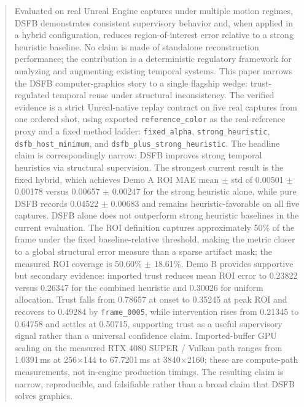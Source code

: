 \documentclass[11pt,letterpaper]{article}
\theoremstyle{gcresult}
\theoremstyle{definition}
\begin{document}
\begin{abstract}
Evaluated on real Unreal Engine captures under multiple motion regimes, DSFB demonstrates consistent supervisory behavior and, when applied in a hybrid configuration, reduces region-of-interest error relative to a strong heuristic baseline. No claim is made of standalone reconstruction performance; the contribution is a deterministic regulatory framework for analyzing and augmenting existing temporal systems.
This paper narrows the DSFB computer-graphics story to a single flagship wedge: trust-regulated temporal reuse under structural inconsistency. The verified evidence is a strict Unreal-native replay contract on five real captures from one ordered shot, using exported \texttt{reference\_color} as the real-reference proxy and a fixed method ladder: \texttt{fixed\_alpha}, \texttt{strong\_heuristic}, \texttt{dsfb\_host\_minimum}, and \texttt{dsfb\_plus\_strong\_heuristic}. The headline claim is correspondingly narrow: DSFB improves strong temporal heuristics via structural supervision. The strongest current result is the fixed hybrid, which achieves Demo A ROI MAE mean $\pm$ std of 0.00501 $\pm$ 0.00178 versus 0.00657 $\pm$ 0.00247 for the strong heuristic alone, while pure DSFB records 0.04522 $\pm$ 0.00683 and remains heuristic-favorable on all five captures. DSFB alone does not outperform strong heuristic baselines in the current evaluation. The ROI definition captures approximately 50\% of the frame under the fixed baseline-relative threshold, making the metric closer to a global structural error measure than a sparse artifact mask; the measured ROI coverage is 50.60\% $\pm$ 18.61\%. Demo B provides supportive but secondary evidence: imported trust reduces mean ROI error to 0.23822 versus 0.26347 for the combined heuristic and 0.30026 for uniform allocation. Trust falls from 0.78657 at onset to 0.35245 at peak ROI and recovers to 0.49284 by \texttt{frame\_0005}, while intervention rises from 0.21345 to 0.64758 and settles at 0.50715, supporting trust as a useful supervisory signal rather than a universal confidence claim. Imported-buffer GPU scaling on the measured RTX 4080 SUPER / Vulkan path ranges from 1.0391\,ms at 256$\times$144 to 67.7201\,ms at 3840$\times$2160; these are compute-path measurements, not in-engine production timings. The resulting claim is narrow, reproducible, and falsifiable rather than a broad claim that DSFB solves graphics.
\end{abstract}
\end{document}
